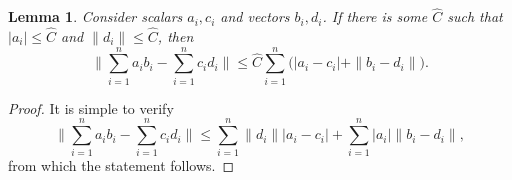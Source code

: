\documentclass[]{interact}
\theoremstyle{plain}%
\newtheorem{lemma}[theorem]{Lemma}
\theoremstyle{definition}
\theoremstyle{remark}
\newcommand{\norm}[1]{\|#1\|}
\newcommand{\normlr}[1]{\|#1\|}
\newcommand{\nrm}[1]{|#1|}
\begin{document}
\begin{lemma}\label{lemma:product}
Consider scalars $a_i,c_i$ and vectors $b_i,d_i$. If there is some $\hat C$ such that $\nrm{a_i}\le \hat C$ and $\norm{d_i}\le \hat C$, then
$$
\normlr{\sum_{i=1}^n a_ib_i - \sum_{i=1}^n c_id_i} \le \hat C\sum_{i=1}^n \Big(\nrm{a_i-c_i} + \norm{b_i-d_i}\Big).
$$
\end{lemma}
\begin{proof}
It is simple to verify
$$
\normlr{\sum_{i=1}^n a_ib_i - \sum_{i=1}^n c_id_i} \le \sum_{i=1}^n \norm{d_i}\nrm{a_i-c_i} + \sum_{i=1}^n \nrm{a_i}\norm{b_i-d_i},
$$
from which the statement follows.
\end{proof}








\end{document}
